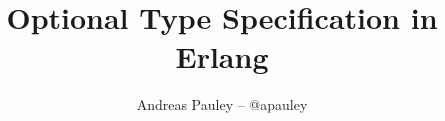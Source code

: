 \documentclass{beamer}
\title[Types in Erlang]{Optional Type Specification in Erlang}
\author{Andreas Pauley -- @apauley}
\institute{Lambda Luminaries -- @lambdaluminary}
\date{}
\begin{document}
\begin{frame}
  \titlepage
\end{frame}
\end{document}

